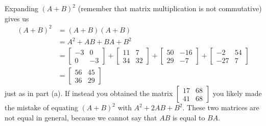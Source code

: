 \begin{example}
\item Expanding $(A+B)^2$ (remember that matrix multiplication is not commutative) gives us
\begin{align*}
(A+B)^2 &= (A+B)(A+B) \\
	&= A^2 + AB + BA + B^2 \\
	&= \left[ \begin{array}{rr} -3&0 \\ 0&-3 \end{array} \right] +  \left[ \begin{array}{cc} 11&7 \\ 34&32 \end{array} \right] +  \left[ \begin{array}{cr} 50&-16 \\ 29&-7 \end{array} \right] +  \left[ \begin{array}{rc} -2&54 \\ -27&7 \end{array} \right] \\
	&=  \left[ \begin{array}{cc} 56&45 \\ 36&29 \end{array} \right] 
\end{align*}
just as in part (a). If instead you obtained the matrix  $\left[ \begin{array}{cc} 17&68 \\41&68 \end{array} \right]$ you likely made the mistake of equating $(A+B)^2$ with $A^2+2AB+B^2$. These two matrices are not equal in general, because we cannot say that $AB$ is equal to $BA$. 

\ea
	
\end{example}


